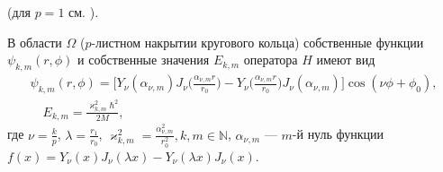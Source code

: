 \begin{theorem}{\normalfont (для $p=1$ см. \cite[с.~165.]{wref10})}.

В  области $\Omega$ ($p$-листном накрытии кругового кольца)  собственные функции $\psi_{k,m}(r,\phi)$ и собственные значения $E_{k,m}$ оператора $\hat{H}$ имеют вид
\begin{multline*}
\psi_{k,m}(r,\phi) = \biggl[ Y_\nu(\alpha_{\nu, m}) J_\nu\biggl(\frac{\alpha_{\nu, m}r}{r_0}\biggr) - Y_\nu\biggl(\frac{\alpha_{\nu, m}r}{r_0}\biggr) J_\nu(\alpha_{\nu, m}) \biggr] \cos{(\nu \phi+\phi_0)}, \\
\quad E_{k,m}= \frac{\varkappa^2_{k,m}\hbar^2}{2M},
\end{multline*}
где 
$\nu=\frac{k}{p}$,  $\lambda = \frac{r_1}{r_0}$,
$\varkappa^2_{k,m}=\frac{\alpha_{\nu, m}^2}{r_0^2},  k, m \in \mathbb{N}$, $\alpha_{\nu, m}$ --- $m$-й нуль функции $f(x) = Y_\nu(x) J_\nu(\lambda x) - Y_\nu(\lambda x) J_\nu(x)$.
\label{th:sect1_theorem1}
\end{theorem}
